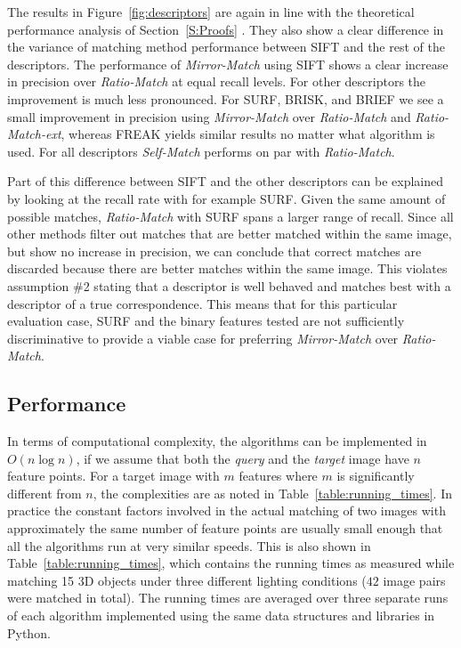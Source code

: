 \documentclass[10pt,journal,cspaper,compsoc]{IEEEtran}
\begin{document}
The results in Figure~\ref{fig:descriptors} are again in line with the theoretical performance analysis of Section~\ref{S:Proofs} .
They also show a clear difference in the variance of matching method 
performance between SIFT and the rest of the descriptors. The 
performance of \emph{Mirror-Match} using SIFT shows a clear increase in 
precision over \emph{Ratio-Match} at equal recall levels. For other 
descriptors the improvement is much less pronounced.  For SURF, BRISK, 
and BRIEF we see a small improvement in precision using 
\emph{Mirror-Match} over \emph{Ratio-Match} and \emph{Ratio-Match-ext}, 
whereas FREAK yields similar results no matter what algorithm is used.  
For all descriptors \emph{Self-Match} performs on par with 
\emph{Ratio-Match}.

Part of this difference between SIFT and the 
other descriptors can be explained by looking at the recall rate 
with for example SURF\@. Given the same amount of possible matches, 
\emph{Ratio-Match} with SURF spans a larger range of recall.  
Since all other methods filter out matches that are better matched 
within the same image, but show no increase in precision, we can conclude 
that correct matches are discarded because there are better matches 
within the same image. This violates assumption \#2 stating that a 
descriptor is well behaved and matches best with a descriptor of a true 
correspondence. This means that for this particular evaluation case, SURF 
and the binary features tested are not sufficiently discriminative to 
provide a viable case for preferring \emph{Mirror-Match} over 
\emph{Ratio-Match}.

\subsection{Performance}

In terms of computational complexity, the algorithms can be implemented 
in $O(n\log n)$, if we assume that both the \emph{query} and the 
\emph{target} image have $n$ feature points. For a target image with $m$ 
features where $m$ is significantly different from $n$, the complexities 
are as noted in Table~\ref{table:running_times}. 
In practice the constant factors 
involved in the actual matching of two images with approximately the 
same number of feature points are usually small enough that all the 
algorithms run at very similar speeds. This is also shown in 
Table~\ref{table:running_times}, which contains the running times as measured 
while matching 15 3D objects under three different lighting conditions 
($42$ image pairs were matched in total). The running times are averaged 
over three separate runs of each algorithm implemented using the same 
data structures and libraries in Python. 
\end{document}
